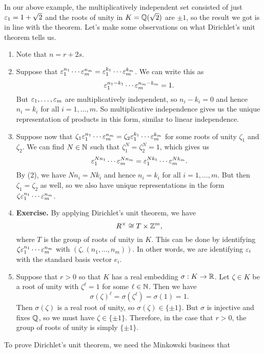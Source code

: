In our above example, the multiplicatively independent set consisted 
of just $\varepsilon_1 = 1 + \sqrt{2}$ and the roots of unity in 
$K = \mathbb{Q}(\sqrt{2})$ are $\pm 1$, so the result we got is in line with 
the theorem. 
\newpage
Let's make some observations on what Dirichlet's unit theorem tells us.
\begin{enumerate}[(1)]
    \item Note that $n = r + 2s$. 
    \item Suppose that $\varepsilon_1^{n_1} \cdots \varepsilon_m^{n_m} = \varepsilon_1^{k_1} 
    \cdots \varepsilon_m^{k_m}$. We can write this as 
    \[ \varepsilon_1^{n_1-k_1} \cdots \varepsilon_m^{n_m-k_m} = 1. \] 
    But $\varepsilon_1, \dots, \varepsilon_m$ are multiplicatively independent, 
    so $n_i - k_i = 0$ and hence $n_i = k_i$ for all $i = 1, \dots, m$. 
    So multiplicative independence gives us the unique representation 
    of products in this form, similar to linear independence.
    \item Suppose now that $\zeta_1 \varepsilon_1^{n_1} \cdots \varepsilon_m^{n_m} 
    = \zeta_2 \varepsilon_1^{k_1} \cdots \varepsilon_m^{k_m}$ for some roots of 
    unity $\zeta_1$ and $\zeta_2$. We can find $N \in \mathbb{N}$ such that 
    $\zeta_1^N = \zeta_2^N = 1$, which gives us 
    \[ \varepsilon_1^{Nn_1} \cdots \varepsilon_m^{Nn_m} = \varepsilon_1^{Nk_1} \cdots \varepsilon_m^{Nk_m}. \] 
    By (2), we have $Nn_i = Nk_i$ and hence $n_i = k_i$ for all $i = 1, \dots, m$. 
    But then $\zeta_1 = \zeta_2$ as well, so we also have unique representations 
    in the form $\zeta\varepsilon_1^{n_1} \cdots \varepsilon_m^{n_m}$. 
    \item {\bf Exercise.} By applying Dirichlet's unit theorem, we have 
    \[ R^\times \cong T \times \mathbb{Z}^m, \] 
    where $T$ is the group of roots of unity in $K$.
    This can be done by identifying $\zeta\varepsilon_1^{n_1} \cdots \varepsilon_m^{n_m}$ 
    with $(\zeta, (n_1, \dots, n_m))$. In other words, we are identifying
    $\varepsilon_i$ with the standard basis vector $e_i$. 
    \item Suppose that $r > 0$ so that $K$ has a real embedding $\sigma : K \to \mathbb{R}$. 
    Let $\zeta \in K$ be a root of unity with $\zeta^\ell = 1$ for some 
    $\ell \in \mathbb{N}$. Then we have 
    \[ \sigma(\zeta)^\ell = \sigma(\zeta^\ell) = \sigma(1) = 1. \] 
    Then $\sigma(\zeta)$ is a real root of unity, so $\sigma(\zeta) \in \{\pm1\}$. 
    But $\sigma$ is injective and fixes $\mathbb{Q}$, so we must have $\zeta \in \{\pm1\}$.
    Therefore, in the case that $r > 0$, the group of roots of unity 
    is simply $\{\pm1\}$.
\end{enumerate}
To prove Dirichlet's unit theorem, we need the Minkowski business that 

